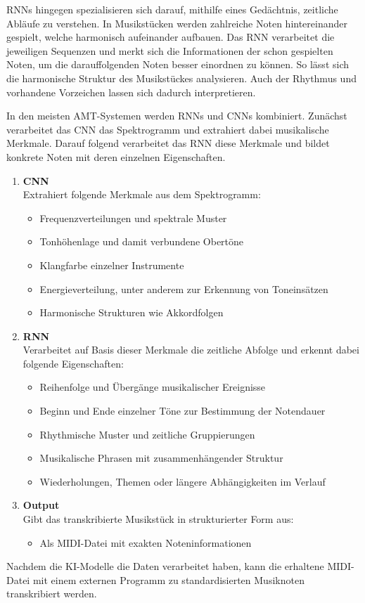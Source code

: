 RNNs hingegen spezialisieren sich darauf, mithilfe eines Gedächtnis, zeitliche Abläufe zu verstehen.
In Musikstücken werden zahlreiche Noten hintereinander gespielt, welche harmonisch aufeinander aufbauen.
Das RNN verarbeitet die jeweiligen Sequenzen und merkt sich die Informationen der schon gespielten Noten,
um die darauffolgenden Noten besser einordnen zu können.
So lässt sich die harmonische Struktur des Musikstückes analysieren.
Auch der Rhythmus und vorhandene Vorzeichen lassen sich dadurch interpretieren\cite{Boeck2012}.

In den meisten AMT-Systemen werden RNNs und CNNs kombiniert.
Zunächst verarbeitet das CNN das Spektrogramm und extrahiert dabei musikalische Merkmale.
Darauf folgend verarbeitet das RNN diese Merkmale und bildet konkrete Noten mit deren einzelnen Eigenschaften.
\begin{enumerate}
    \item \textbf{CNN}\\
    Extrahiert folgende Merkmale aus dem Spektrogramm:
    \begin{itemize}
        \item Frequenzverteilungen und spektrale Muster
        \item Tonhöhenlage und damit verbundene Obertöne
        \item Klangfarbe einzelner Instrumente
        \item Energieverteilung, unter anderem zur Erkennung von Toneinsätzen
        \item Harmonische Strukturen wie Akkordfolgen
    \end{itemize}

    \item \textbf{RNN}\\
    Verarbeitet auf Basis dieser Merkmale die zeitliche Abfolge und erkennt dabei folgende Eigenschaften:
    \begin{itemize}
        \item Reihenfolge und Übergänge musikalischer Ereignisse
        \item Beginn und Ende einzelner Töne zur Bestimmung der Notendauer
        \item Rhythmische Muster und zeitliche Gruppierungen
        \item Musikalische Phrasen mit zusammenhängender Struktur
        \item Wiederholungen, Themen oder längere Abhängigkeiten im Verlauf
    \end{itemize}

    \item \textbf{Output} \\
    Gibt das transkribierte Musikstück in strukturierter Form aus:
    \begin{itemize}
        \item Als MIDI-Datei mit exakten Noteninformationen
    \end{itemize}
\end{enumerate}
Nachdem die KI-Modelle die Daten verarbeitet haben, kann die erhaltene MIDI-Datei mit einem externen Programm
zu standardisierten Musiknoten transkribiert werden.

